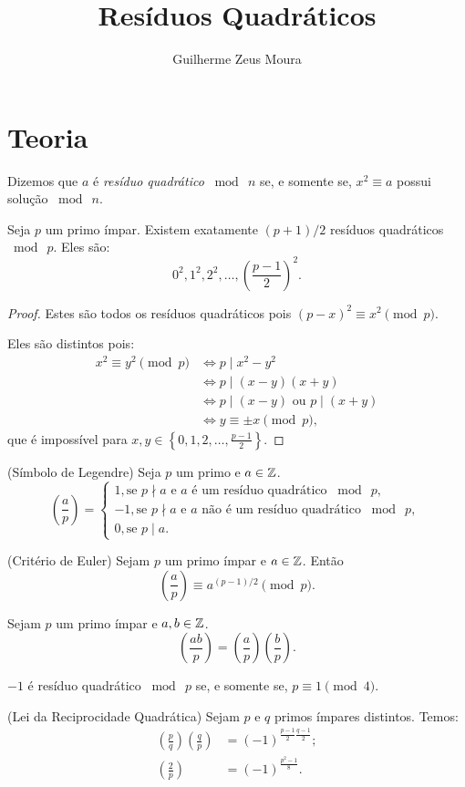 \documentclass[10pt,a4paper]{article}
\title{Resíduos Quadráticos}
\author{Guilherme Zeus Moura}
\newcommand{\leg}[2]{\left(\frac{#1}{#2}\right)}
\newcommand{\tmod}[1]{\bmod{\ #1}}
\begin{document}
	
	\zeustitle
	\section{Teoria}
	\begin{defn}
		Dizemos que $a$ é \textit{resíduo quadrático} $\tmod{n}$ se, e somente se, $x^2 \equiv a$ possui solução $\tmod{n}$.
	\end{defn}
	\begin{prop}
		Seja $p$ um primo ímpar. Existem exatamente $(p+1)/2$ resíduos quadráticos $\tmod{p}$. Eles são:
		$$ 0^2,  1^2, 2^2, \dots, \left( \frac{p-1}{2} \right)^2.$$
	\end{prop}
	\begin{proof}
		Estes são todos os resíduos quadráticos pois $(p-x)^2 \equiv x^2 \pmod{p}$.
		
		Eles são distintos pois:
		\begin{align*}
			x^2 \equiv y^2 \pmod{p} & \iff p \mid x^2 - y^2\\
			                        & \iff p \mid (x - y)(x + y)\\
				           	 	    & \iff p \mid (x-y) \text{ ou } p \mid (x+y)\\
						            & \iff y \equiv \pm x \pmod{p},
		\end{align*}
		que é impossível para $x, y \in \left\{ 0, 1, 2, \dots, \frac{p-1}{2} \right\}$.
	\end{proof}
	\begin{defn}(Símbolo de Legendre)
		Seja $p$ um primo e $a \in \mathbb{Z}$.
		$$\leg{a}{p} =
		\begin{cases}
			1,  \text{se $p \nmid a$ e $a$ é um resíduo quadrático $\tmod{p}$, }\\
			-1, \text{se $p \nmid a$  e $a$ não é um resíduo quadrático $\tmod{p}$, }\\
			0,  \text{se $p \mid a$.}
		\end{cases}$$
	\end{defn}
	\begin{thm}(Critério de Euler)
		Sejam $p$ um primo ímpar e $a \in \mathbb{Z}$. Então
		$$\leg{a}{p} \equiv a^{(p-1)/2}\pmod{p}.$$
	\end{thm}
	\begin{cor}
		Sejam $p$ um primo ímpar e $a, b \in \mathbb{Z}$.
		$$\leg{ab}{p} = \leg{a}{p}\leg{b}{p}.$$
	\end{cor}
	\begin{cor}
		$-1$ é resíduo quadrático $\tmod{p}$ se, e somente se, $p \equiv 1 \pmod{4}$.
	\end{cor}
	\begin{thm}(Lei da Reciprocidade Quadrática)
		Sejam $p$ e $q$ primos ímpares distintos. Temos:
		\begin{align*}
			\leg{p}{q} \leg{q}{p} & = (-1)^{\frac{p-1}{2}\frac{q-1}{2}};\\
			\leg{2}{p} & = (-1)^\frac{p^2 - 1}{8}.
		\end{align*}
	\end{thm}\
\end{document}
